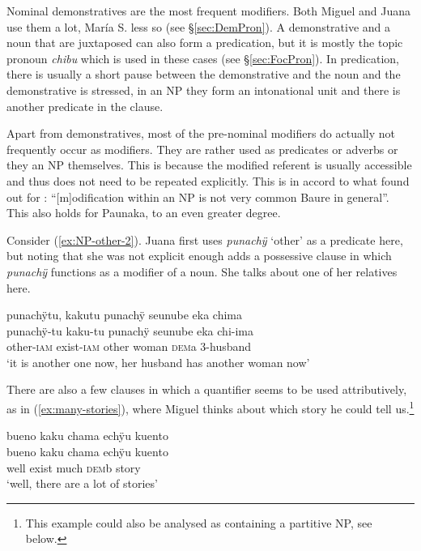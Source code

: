 Nominal demonstratives are the most frequent modifiers. Both Miguel and Juana use them a lot, María S. less so (see §\ref{sec:DemPron}). A demonstrative and a noun that are juxtaposed can also form a predication, but it is mostly the topic pronoun \textit{chibu} which is used in these cases (see §\ref{sec:FocPron}). In predication, there is usually a short pause between the demonstrative and the noun and the demonstrative is stressed, in an NP they form an intonational unit and there is another predicate in the clause.

Apart from demonstratives, most of the pre-nominal modifiers do actually not frequently occur as modifiers. They are rather used as predicates or adverbs or they  an NP themselves. This is because the modified referent is usually accessible and thus does not need to be repeated explicitly. This is in accord to what \citet[168]{Danielsen2007} found out for : “[m]odification within an NP is not very common Baure in general”. This also holds for Paunaka, to an even greater degree. 

Consider (\ref{ex:NP-other-2}). Juana first uses \textit{punachÿ} ‘other’ as a predicate here, but noting that she was not explicit enough adds a possessive clause in which \textit{punachÿ} functions as a modifier of a noun. She talks about one of her relatives here.

\ea\label{ex:NP-other-2}
\begingl
\glpreamble punachÿtu, kakutu punachÿ seunube eka chima\\
\gla punachÿ-tu kaku-tu punachÿ seunube eka chi-ima\\
\glb other-\textsc{iam} exist-\textsc{iam} other woman \textsc{dem}a 3-husband\\
\glft ‘it is another one now, her husband has another woman now’
\endgl
\trailingcitation{[jxx-p120430l-1.402]}
\xe

There are also a few clauses in which a quantifier seems to be used attributively, as in (\ref{ex:many-stories}), where Miguel thinks about which story he could tell us.\footnote{This example could also be analysed as containing a partitive NP, see below.}

\ea\label{ex:many-stories}
\begingl
\glpreamble bueno kaku chama echÿu kuento\\
\gla bueno kaku chama echÿu kuento\\
\glb well exist much \textsc{dem}b story\\
\glft ‘well, there are a lot of stories’
\endgl
\trailingcitation{[jmx-n120429ls-x5.048]}
\xe

